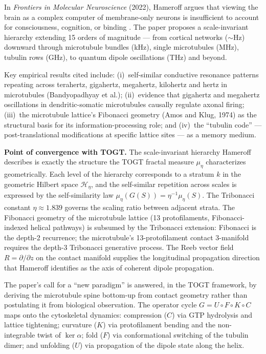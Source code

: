 \documentclass[11pt,a4paper]{article}
\theoremstyle{definition}
\theoremstyle{remark}
\begin{document}
In \textit{Frontiers in Molecular Neuroscience} (2022), Hameroff argues that viewing the brain
as a complex computer of membrane-only neurons is insufficient to account for consciousness,
cognition, or binding \cite{Hameroff2022Cytoskeleton}. The paper proposes a scale-invariant
hierarchy extending 15 orders of magnitude --- from cortical networks ($\sim$Hz) downward
through microtubule bundles (kHz), single microtubules (MHz), tubulin rows (GHz), to quantum
dipole oscillations (THz) and beyond.

Key empirical results cited include: (i)~self-similar conductive resonance patterns repeating
across terahertz, gigahertz, megahertz, kilohertz and hertz in microtubules (Bandyopadhyay
et al.); (ii)~evidence that gigahertz and megahertz oscillations in dendritic-somatic
microtubules causally regulate axonal firing; (iii)~the microtubule lattice's Fibonacci
geometry (Amos and Klug, 1974) as the structural basis for its information-processing role;
and (iv)~the ``tubulin code'' --- post-translational modifications at specific lattice sites
--- as a memory medium.

\textbf{Point of convergence with TOGT.} The scale-invariant hierarchy Hameroff describes is
exactly the structure the TOGT fractal measure $\mu_\eta$ characterizes geometrically. Each
level of the hierarchy corresponds to a stratum $k$ in the geometric Hilbert space
$\mathcal{H}_\eta$, and the self-similar repetition across scales is expressed by the
self-similarity law $\mu_\eta(G(S))=\eta^{-1}\mu_\eta(S)$. The Tribonacci constant
$\eta\approx1.839$ governs the scaling ratio between adjacent strata. The Fibonacci geometry
of the microtubule lattice (13 protofilaments, Fibonacci-indexed helical pathways) is subsumed
by the Tribonacci extension: Fibonacci is the depth-2 recurrence; the microtubule's
13-protofilament contact 3-manifold requires the depth-3 Tribonacci generative process. The
Reeb vector field $R=\partial/\partial z$ on the contact manifold supplies the longitudinal
propagation direction that Hameroff identifies as the axis of coherent dipole propagation.

The paper's call for a ``new paradigm'' is answered, in the TOGT framework, by deriving the
microtubule spine bottom-up from contact geometry rather than postulating it from biological
observation. The operator cycle $G=U\circ F\circ K\circ C$ maps onto the cytoskeletal
dynamics: compression ($C$) via GTP hydrolysis and lattice tightening; curvature ($K$) via
protofilament bending and the non-integrable twist of $\ker\alpha$; fold ($F$) via
conformational switching of the tubulin dimer; and unfolding ($U$) via propagation of the
dipole state along the helix.
\end{document}
